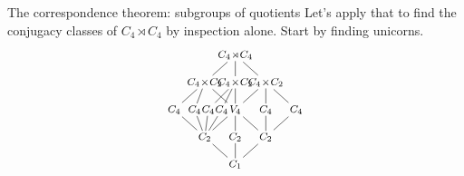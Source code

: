 \documentclass[8pt, handout]{beamer}
\begin{document}
\begin{frame}{The correspondence theorem: subgroups of quotients}
  Let's apply that to find the conjugacy classes of $C_4\!\rtimes\!C_4$
  by inspection alone. Start by finding unicorns.
  \[
  \begin{tikzpicture}[shorten >= -2pt, shorten <= -2pt,xscale=1.2,scale=.7]
    \tikzstyle{every node}=[font=\footnotesize]
    \begin{scope}[shift={(0,0)},scale=.75,yscale=1.6,scale=.9]
      \node (G) at (0,4) {$C_4\!\rtimes\!C_4$};
      \node (C4xC2-1) at (-1.5,3) {$C_4\!\times\!C_2$};
      \node (C4xC2-2) at (0,3) {$C_4\!\times\!C_2$};
      \node (C4xC2-3) at (1.5,3) {$C_4\!\times\!C_2$};
      \node (C4-1) at (-3,2) {$C_4$};
      \node (C4-2) at (-2,2) {$C_4$};
      \node (C4-3) at (-1.33,2) {$C_4$};
      \node (C4-4) at (-.67,2) {$C_4$};
      \node (C4-5) at (1.5,2) {$C_4$};
      \node (C4-6) at (3,2) {$C_4$};
      \node (V4) at (0,2) {$V_4$};
      \node (C2-1) at (-1.5,1) {$C_2$};
      \node (C2-2) at (0,1) {$C_2$};
      \node (C2-3) at (1.5,1) {$C_2$};
      \node (1) at (0,0) {$C_1$};
      \draw (G) to (C4xC2-1);
      \draw (G) to (C4xC2-2);
      \draw (G) to (C4xC2-3);
      \draw (C4xC2-1) to (C4-1);
      \draw (C4xC2-1) to (C4-2);
      \draw (C4xC2-1) to (V4); 
      \draw (C4xC2-2) to (C4-3);
      \draw (C4xC2-2) to (C4-4);
      \draw (C4xC2-2) to (V4); 
      \draw (C4xC2-3) to (C4-5);
      \draw (C4xC2-3) to (C4-6);
      \draw (C4xC2-3) to (V4);
      \draw (C4-1) to (C2-1); \draw (C4-2) to (C2-1);
      \draw (C4-3) to (C2-1); \draw (C4-4) to (C2-1);
      \draw (V4) to (C2-1); 
      \draw (V4) to (C2-2); \draw (V4) to (C2-3);
      \draw (C4-5) to (C2-3); \draw (C4-6) to (C2-3);
      \draw (C2-1) to (1); 
      \draw (C2-2) to (1); 
      \draw (C2-3) to (1);
    \end{scope}
  \end{tikzpicture}
  \]
  
\end{frame}

\end{document}
